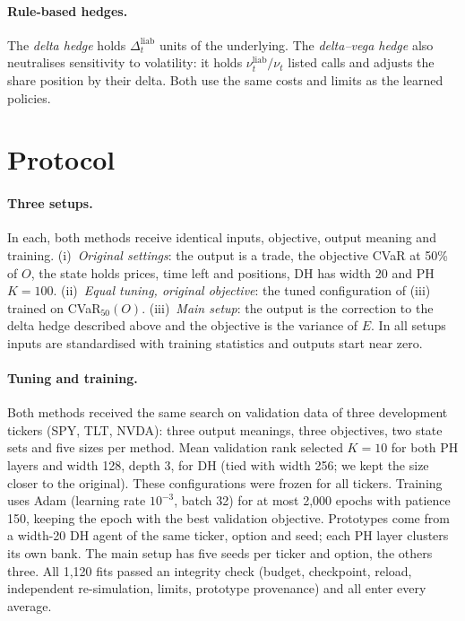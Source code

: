 \documentclass[runningheads]{llncs}
\begin{document}
\paragraph{Rule-based hedges.} The \emph{delta hedge} holds $\Delta^{\mathrm{liab}}_t$ units of the
underlying. The \emph{delta--vega hedge} also neutralises sensitivity to volatility: it holds
$\nu^{\mathrm{liab}}_t/\nu_t$ listed calls and adjusts the share position by their delta. Both use the
same costs and limits as the learned policies.

\section{Protocol}
\label{sec:protocol}

\paragraph{Three setups.} In each, both methods receive identical inputs, objective, output meaning and
training. (i)~\emph{Original settings}: the output is a trade, the objective CVaR at 50\% of $O$, the state
holds prices, time left and positions, DH has width 20 and PH $K=100$. (ii)~\emph{Equal tuning, original
objective}: the tuned configuration of (iii) trained on CVaR$_{50}(O)$. (iii)~\emph{Main setup}: the output
is the correction to the delta hedge described above and the objective is the variance of $E$. In all
setups inputs are standardised with training statistics and outputs start near zero.

\paragraph{Tuning and training.} Both methods received the same search on validation data of three
development tickers (SPY, TLT, NVDA): three output meanings, three objectives, two state sets and five
sizes per method. Mean validation rank selected $K=10$ for both PH layers and width 128, depth 3, for DH
(tied with width 256; we kept the size closer to the original). These configurations were frozen for all
tickers. Training uses Adam (learning rate $10^{-3}$, batch 32) for at most 2,000 epochs with patience
150, keeping the epoch with the best validation objective. Prototypes come from a width-20 DH agent of the
same ticker, option and seed; each PH layer clusters its own bank. The main setup has five seeds per
ticker and option, the others three. All 1,120 fits passed an integrity check (budget, checkpoint, reload,
independent re-simulation, limits, prototype provenance) and all enter every average.
\end{document}
